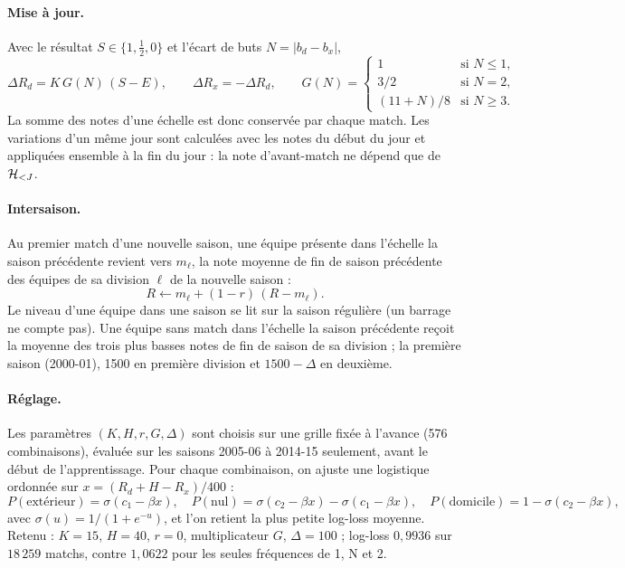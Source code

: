 \paragraph{Mise à jour.} Avec le résultat \(S \in \{1, \tfrac12, 0\}\) et l'écart de buts
\(N = |b_d - b_x|\),
\[
  \Delta R_d = K \, G(N) \, (S - E), \qquad \Delta R_x = -\Delta R_d,
  \qquad
  G(N) =
  \begin{cases}
    1 & \text{si } N \le 1,\\
    3/2 & \text{si } N = 2,\\
    (11 + N)/8 & \text{si } N \ge 3.
  \end{cases}
\]
La somme des notes d'une échelle est donc conservée par chaque match. Les variations d'un même
jour sont calculées avec les notes du début du jour et appliquées ensemble à la fin du jour : la
note d'avant-match ne dépend que de \(\mathcal{H}_{<J}\).

\paragraph{Intersaison.} Au premier match d'une nouvelle saison, une équipe présente dans l'échelle
la saison précédente revient vers \(m_\ell\), la note moyenne de fin de saison précédente des
équipes de sa division \(\ell\) de la nouvelle saison :
\[
  R \leftarrow m_\ell + (1 - r)\,(R - m_\ell).
\]
Le niveau d'une équipe dans une saison se lit sur la saison régulière (un barrage ne compte pas).
Une équipe sans match dans l'échelle la saison précédente reçoit la moyenne des trois plus basses
notes de fin de saison de sa division ; la première saison (2000-01), 1500 en première division et
\(1500 - \Delta\) en deuxième.

\paragraph{Réglage.} Les paramètres \((K, H, r, G, \Delta)\) sont choisis sur une grille fixée à
l'avance (576 combinaisons), évaluée sur les saisons 2005-06 à 2014-15 seulement, avant le début
de l'apprentissage. Pour chaque combinaison, on ajuste une logistique ordonnée sur
\(x = (R_d + H - R_x)/400\) :
\[
  P(\text{extérieur}) = \sigma(c_1 - \beta x),\quad
  P(\text{nul}) = \sigma(c_2 - \beta x) - \sigma(c_1 - \beta x),\quad
  P(\text{domicile}) = 1 - \sigma(c_2 - \beta x),
\]
avec \(\sigma(u) = 1/(1+e^{-u})\), et l'on retient la plus petite log-loss moyenne. Retenu :
\(K = 15\), \(H = 40\), \(r = 0\), multiplicateur \(G\), \(\Delta = 100\) ; log-loss
\(0{,}9936\) sur \(18\,259\) matchs, contre \(1{,}0622\) pour les seules fréquences de 1, N et 2.

